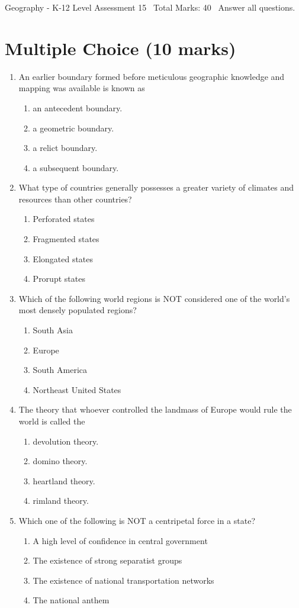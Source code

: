 \documentclass[12pt]{article}
\begin{document}
\begin{center}
Geography - K-12 Level Assessment 15 \
Total Marks: 40 \
Answer all questions.
\end{center}

\section*{Multiple Choice (10 marks)}
\begin{enumerate}[label=\arabic*.]
\item An earlier boundary formed before meticulous geographic knowledge and mapping was available is known as
\begin{enumerate}[label=(\alph*)]
    \item an antecedent boundary.
    \item a geometric boundary.
    \item a relict boundary.
    \item a subsequent boundary.
\end{enumerate}
\item What type of countries generally possesses a greater variety of climates and resources than other countries?
\begin{enumerate}[label=(\alph*)]
    \item Perforated states
    \item Fragmented states
    \item Elongated states
    \item Prorupt states
\end{enumerate}
\item Which of the following world regions is NOT considered one of the world's most densely populated regions?
\begin{enumerate}[label=(\alph*)]
    \item South Asia
    \item Europe
    \item South America
    \item Northeast United States
\end{enumerate}
\item The theory that whoever controlled the landmass of Europe would rule the world is called the
\begin{enumerate}[label=(\alph*)]
    \item devolution theory.
    \item domino theory.
    \item heartland theory.
    \item rimland theory.
\end{enumerate}
\item Which one of the following is NOT a centripetal force in a state?
\begin{enumerate}[label=(\alph*)]
    \item A high level of confidence in central government
    \item The existence of strong separatist groups
    \item The existence of national transportation networks
    \item The national anthem
\end{enumerate}
\end{enumerate}
\end{document}
